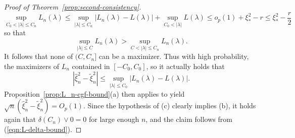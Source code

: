 \documentclass{article}
\theoremstyle{definition}
\newcommand*\eps{\epsilon}
\renewcommand*\epsilon{\varepsilon}
\newcommand{\1}{\mathbbm{1}}
\begin{document}
\begin{proof}[Proof of Theorem~\ref{prop:second-consistency}]
    \[
    \sup_{C_0 < |\lambda| \leq C_n} L_n(\lambda) \leq \sup_{|\lambda| \leq C_n} |L_n(\lambda) - L(\lambda)| + \sup_{C_0 < |\lambda|} L(\lambda) \leq o_p(1) + \xi_*^2 - r  \leq \xi_*^2 - \frac{r}{2}
    \]
    so that
    \[
    \sup_{|\lambda| \leq C} L_n(\lambda) > \sup_{C < |\lambda| \leq C_n} L_n(\lambda).
    \]
    It follows that none of $(C, C_n]$ can be a maximizer. Thus with high probability, the maximizers of $L_n$ contained in $[-C_0, C_0]$, so it actually holds that 
    \[
    |\hat \xi^2_n - \tilde \xi^2_n| \leq \sup_{|\lambda| \leq C_0} |L_n(\lambda) - L(\lambda)|.
    \]    Proposition~\ref{prop:L_n-cgf-bound}(a) then applies to yield $\sqrt n(\hat \xi_n^2 - \tilde \xi^2_n) = O_p(1)$. Since the hypothesis of (c) clearly implies (b), it holds again that $\delta(C_n) \vee 0 = 0$ for large enough $n$, and the claim follows from (\ref{eqn:L-delta-bound}).
\end{proof}
\end{document}
